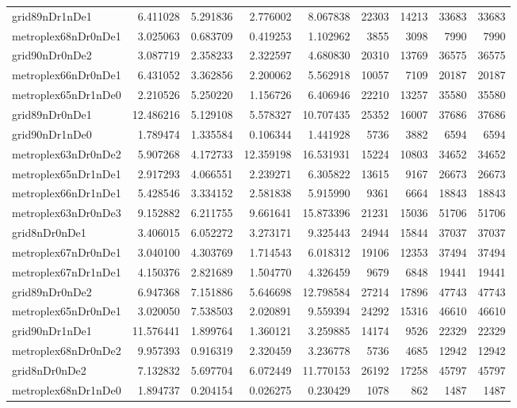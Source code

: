 \begin{longtable}{|l|r|r|r|r|r|r|r|r|}
grid89nDr1nDe1 & 6.411028 & 5.291836 & 2.776002 & 8.067838 & 22303 & 14213 & 33683 & 33683 \\
metroplex68nDr0nDe1 & 3.025063 & 0.683709 & 0.419253 & 1.102962 & 3855 & 3098 & 7990 & 7990 \\
grid90nDr0nDe2 & 3.087719 & 2.358233 & 2.322597 & 4.680830 & 20310 & 13769 & 36575 & 36575 \\
metroplex66nDr0nDe1 & 6.431052 & 3.362856 & 2.200062 & 5.562918 & 10057 & 7109 & 20187 & 20187 \\
metroplex65nDr1nDe0 & 2.210526 & 5.250220 & 1.156726 & 6.406946 & 22210 & 13257 & 35580 & 35580 \\
grid89nDr0nDe1 & 12.486216 & 5.129108 & 5.578327 & 10.707435 & 25352 & 16007 & 37686 & 37686 \\
grid90nDr1nDe0 & 1.789474 & 1.335584 & 0.106344 & 1.441928 & 5736 & 3882 & 6594 & 6594 \\
metroplex63nDr0nDe2 & 5.907268 & 4.172733 & 12.359198 & 16.531931 & 15224 & 10803 & 34652 & 34652 \\
metroplex65nDr1nDe1 & 2.917293 & 4.066551 & 2.239271 & 6.305822 & 13615 & 9167 & 26673 & 26673 \\
metroplex66nDr1nDe1 & 5.428546 & 3.334152 & 2.581838 & 5.915990 & 9361 & 6664 & 18843 & 18843 \\
metroplex63nDr0nDe3 & 9.152882 & 6.211755 & 9.661641 & 15.873396 & 21231 & 15036 & 51706 & 51706 \\
grid8nDr0nDe1 & 3.406015 & 6.052272 & 3.273171 & 9.325443 & 24944 & 15844 & 37037 & 37037 \\
metroplex67nDr0nDe1 & 3.040100 & 4.303769 & 1.714543 & 6.018312 & 19106 & 12353 & 37494 & 37494 \\
metroplex67nDr1nDe1 & 4.150376 & 2.821689 & 1.504770 & 4.326459 & 9679 & 6848 & 19441 & 19441 \\
grid89nDr0nDe2 & 6.947368 & 7.151886 & 5.646698 & 12.798584 & 27214 & 17896 & 47743 & 47743 \\
metroplex65nDr0nDe1 & 3.020050 & 7.538503 & 2.020891 & 9.559394 & 24292 & 15316 & 46610 & 46610 \\
grid90nDr1nDe1 & 11.576441 & 1.899764 & 1.360121 & 3.259885 & 14174 & 9526 & 22329 & 22329 \\
metroplex68nDr0nDe2 & 9.957393 & 0.916319 & 2.320459 & 3.236778 & 5736 & 4685 & 12942 & 12942 \\
grid8nDr0nDe2 & 7.132832 & 5.697704 & 6.072449 & 11.770153 & 26192 & 17258 & 45797 & 45797 \\
metroplex68nDr1nDe0 & 1.894737 & 0.204154 & 0.026275 & 0.230429 & 1078 & 862 & 1487 & 1487 \\

\end{longtable}
